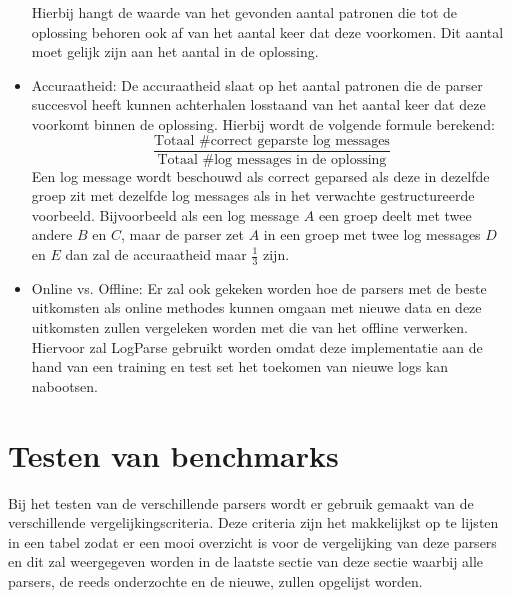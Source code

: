 \begin{itemize}
    Hierbij hangt de waarde van het gevonden aantal patronen die tot de oplossing behoren ook af van het aantal keer dat deze voorkomen. Dit aantal moet gelijk zijn aan het aantal in de oplossing.\\
    
    \item Accuraatheid: De accuraatheid slaat op het aantal patronen die de parser succesvol heeft kunnen achterhalen losstaand van het aantal keer dat deze voorkomt binnen de oplossing. Hierbij wordt de volgende formule berekend: \[\frac{\text{Totaal \# correct geparste log messages}}{\text{Totaal \# log messages in de oplossing}}\] Een log message wordt beschouwd als correct geparsed als deze in dezelfde groep zit met dezelfde log messages als in het verwachte gestructureerde voorbeeld. Bijvoorbeeld als een log message $A$ een groep deelt met twee andere $B$ en $C$, maar de parser zet $A$ in een groep met twee log messages $D$ en $E$ dan zal de accuraatheid maar $\frac{1}{3}$ zijn.\\
    
   \item Online vs. Offline: Er zal ook gekeken worden hoe de parsers met de beste uitkomsten als online methodes kunnen omgaan met nieuwe data en deze uitkomsten zullen vergeleken worden met die van het offline verwerken. Hiervoor zal LogParse gebruikt worden omdat deze implementatie aan de hand van een training en test set het toekomen van nieuwe logs kan nabootsen.
\end{itemize}

\section{Testen van benchmarks}
\label{section:testen}
Bij het testen van de verschillende parsers wordt er gebruik gemaakt van de verschillende vergelijkingscriteria. Deze criteria zijn het makkelijkst op te lijsten in een tabel zodat er een mooi overzicht is voor de vergelijking van deze parsers en dit zal weergegeven worden in de laatste sectie van deze sectie waarbij alle parsers, de reeds onderzochte en de nieuwe, zullen opgelijst worden.\\

